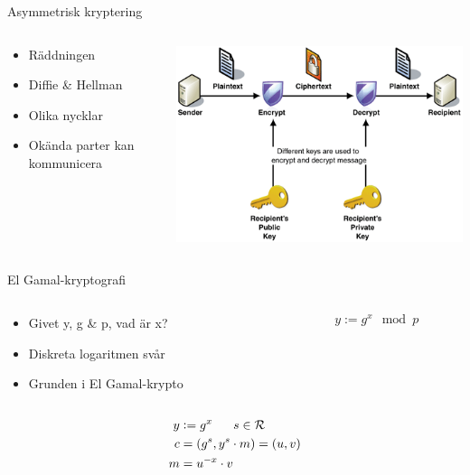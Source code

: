 \begin{frame}{Asymmetrisk kryptering}

\begin{columns}
    \begin{column}{0.45\textwidth}
        \begin{itemize}
			\item Räddningen
			\item Diffie \& Hellman
			\item Olika nycklar
			\item Okända parter kan kommunicera
		\end{itemize}
    \end{column}
	\begin{column}{0.55\textwidth}
    	\includegraphics[width=\textwidth]{images/asymmetric.png}
	\end{column}
\end{columns}

\end{frame}

\begin{frame}{El Gamal-kryptografi}

\begin{columns}
	\begin{column}{0.5\textwidth}
		\begin{itemize}
			\item Givet y, g \& p, vad är x?
			\item Diskreta logaritmen svår
			\item Grunden i El Gamal-krypto
		\end{itemize}
	\end{column}
	\begin{column}{0.5\textwidth}
		{\LARGE $$y := g^x \mod{p}$$}
	\end{column}
\end{columns}

\vspace{3pt}

{\LARGE
\begin{align*}
y &\vcentcolon= g^{x} \,\,\,\,\,\,\,\,\,\, s\in \mathcal{R} \\
c &= (g^s, y^s\cdot m) = (u, v) \\
 m &= u^{-x}\cdot v
\end{align*}}

\end{frame}

